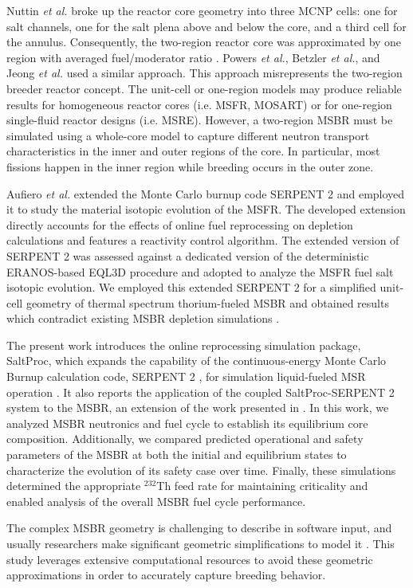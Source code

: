 Nuttin \emph{et al.} broke up the reactor core geometry into three \gls{MCNP} cells: 
one for salt channels, one for the salt plena above and below the core, and a 
third cell for the annulus. Consequently, the two-region reactor core was 
approximated by one region with averaged fuel/moderator ratio 
\cite{nuttin_potential_2005}.  Powers \emph{et 
al.}, Betzler \emph{et al.}, and Jeong \emph{et al.} 
\cite{powers_new_2013,powers_inventory_2014,betzler_modeling_2016, 
betzler_molten_2017, jeong_development_2014, jeong_equilibrium_2016} used a 
similar approach. This approach 
misrepresents the two-region breeder reactor concept. The unit-cell or one-region 
models may produce reliable results for homogeneous reactor cores (i.e. 
\gls{MSFR}, \gls{MOSART}) or for one-region single-fluid reactor designs (i.e. 
\gls{MSRE}). However, a two-region \gls{MSBR} must be simulated using a whole-core 
model to capture different neutron transport characteristics in the inner and 
outer regions of the core. In particular, most fissions happen in the inner 
region while breeding occurs in the outer zone.  

Aufiero \emph{et al.} extended the Monte Carlo burnup code SERPENT 2 and 
employed it to study the material isotopic evolution of the 
\gls{MSFR}\cite{aufiero_extended_2013}. The 
developed extension directly accounts for the effects of online fuel 
reprocessing on depletion calculations and features a reactivity control 
algorithm. The extended version of SERPENT 2 was assessed against a dedicated 
version of the deterministic ERANOS-based EQL3D procedure 
\cite{ruggieri_eranos_2006} and adopted to analyze the \gls{MSFR} fuel salt 
isotopic evolution. We employed this extended SERPENT 2 for a simplified 
unit-cell geometry of thermal spectrum thorium-fueled \gls{MSBR} and obtained 
results which contradict existing \gls{MSBR} depletion simulations 
\cite{jeong_equilibrium_2016}.

The present work introduces the online reprocessing simulation package, SaltProc, 
which expands the capability of the continuous-energy Monte Carlo Burnup 
calculation code, SERPENT 2 \cite{leppanen_serpent_2015-1}, for simulation 
liquid-fueled \gls{MSR} operation 
\cite{andrei_rykhlevskii_arfc/saltproc:_2018}. It also reports the 
application of the coupled SaltProc-SERPENT 2 system to the \gls{MSBR}, an 
extension of the work presented in 
\cite{rykhlevskii_full-core_2017, rykhlevskii_online_2017}. In this work, we 
analyzed \gls{MSBR} neutronics and fuel cycle to establish its equilibrium core 
composition. Additionally, we compared predicted operational and safety parameters of the \gls{MSBR} at 
both the initial and equilibrium states to characterize the evolution of its 
safety case over time. Finally, these simulations determined the appropriate $^{232}$Th feed rate  
for maintaining criticality and enabled analysis of the overall \gls{MSBR} fuel 
cycle performance.

The complex \gls{MSBR} geometry is challenging to describe in software input, 
and usually researchers make significant geometric simplifications to model it 
\cite{park_whole_2015}. This study leverages extensive computational 
resources to avoid these geometric approximations in order to accurately capture 
breeding behavior. 

